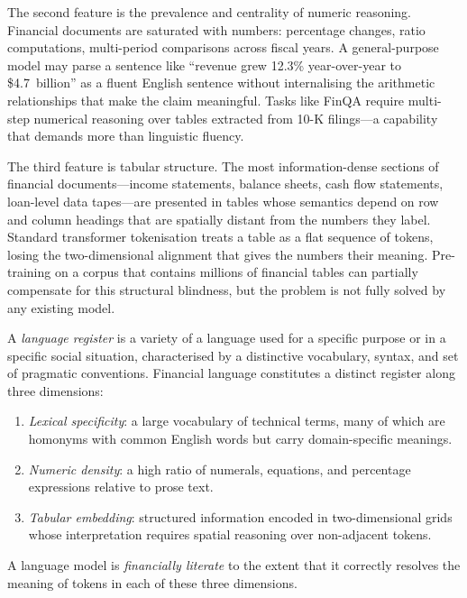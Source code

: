 The second feature is the prevalence and centrality of numeric reasoning.
Financial documents are saturated with numbers: percentage changes, ratio
computations, multi-period comparisons across fiscal years.  A general-purpose
model may parse a sentence like ``revenue grew 12.3\% year-over-year to
\$4.7~billion'' as a fluent English sentence without internalising the arithmetic
relationships that make the claim meaningful.  Tasks like FinQA \cite{chen2021finqa}
require multi-step numerical reasoning over tables extracted from 10-K filings---a
capability that demands more than linguistic fluency.

The third feature is tabular structure.  The most information-dense sections of
financial documents---income statements, balance sheets, cash flow statements,
loan-level data tapes---are presented in tables whose semantics depend on row and
column headings that are spatially distant from the numbers they label.  Standard
transformer tokenisation treats a table as a flat sequence of tokens, losing the
two-dimensional alignment that gives the numbers their meaning.  Pre-training on
a corpus that contains millions of financial tables can partially compensate for
this structural blindness, but the problem is not fully solved by any existing
model.

\begin{definition}
\label{def:ch08-register}
A \emph{language register} is a variety of a language used for a specific
purpose or in a specific social situation, characterised by a distinctive
vocabulary, syntax, and set of pragmatic conventions.  Financial language
constitutes a distinct register along three dimensions:
\begin{enumerate}
  \item \textit{Lexical specificity}: a large vocabulary of technical terms,
        many of which are homonyms with common English words but carry domain-specific
        meanings.
  \item \textit{Numeric density}: a high ratio of numerals, equations, and
        percentage expressions relative to prose text.
  \item \textit{Tabular embedding}: structured information encoded in two-dimensional
        grids whose interpretation requires spatial reasoning over non-adjacent tokens.
\end{enumerate}
A language model is \emph{financially literate} to the extent that it correctly
resolves the meaning of tokens in each of these three dimensions.
\end{definition}

